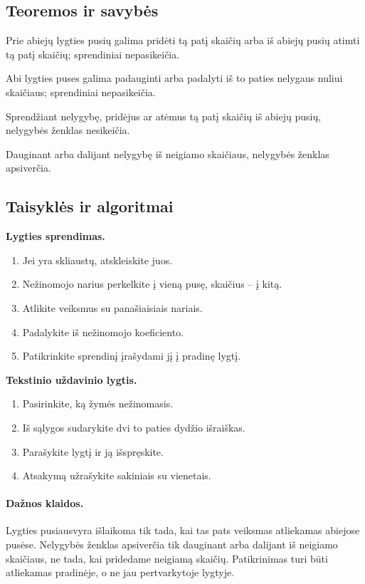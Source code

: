 \subsection{Teoremos ir savybės}
\begin{savybe}
Prie abiejų lygties pusių galima pridėti tą patį skaičių arba iš abiejų pusių atimti tą patį skaičių; sprendiniai nepasikeičia.
\end{savybe}
\begin{savybe}
Abi lygties puses galima padauginti arba padalyti iš to paties nelygaus nuliui skaičiaus; sprendiniai nepasikeičia.
\end{savybe}
\begin{savybe}
Sprendžiant nelygybę, pridėjus ar atėmus tą patį skaičių iš abiejų pusių, nelygybės ženklas nesikeičia.
\end{savybe}
\begin{savybe}
Dauginant arba dalijant nelygybę iš neigiamo skaičiaus, nelygybės ženklas apsiverčia.
\end{savybe}

\subsection{Taisyklės ir algoritmai}
\textbf{Lygties sprendimas.}
\begin{enumerate}[label=\arabic*.]
\item Jei yra skliaustų, atskleiskite juos.
\item Nežinomojo narius perkelkite į vieną pusę, skaičius -- į kitą.
\item Atlikite veiksmus su panašiaisiais nariais.
\item Padalykite iš nežinomojo koeficiento.
\item Patikrinkite sprendinį įrašydami jį į pradinę lygtį.
\end{enumerate}

\textbf{Tekstinio uždavinio lygtis.}
\begin{enumerate}[label=\arabic*.]
\item Pasirinkite, ką žymės nežinomasis.
\item Iš sąlygos sudarykite dvi to paties dydžio išraiškas.
\item Parašykite lygtį ir ją išspręskite.
\item Atsakymą užrašykite sakiniais su vienetais.
\end{enumerate}

\paragraph{Dažnos klaidos.}
Lygties pusiausvyra išlaikoma tik tada, kai tas pats veiksmas atliekamas abiejose pusėse. Nelygybės ženklas apsiverčia tik dauginant arba dalijant iš neigiamo skaičiaus, ne tada, kai pridedame neigiamą skaičių. Patikrinimas turi būti atliekamas pradinėje, o ne jau pertvarkytoje lygtyje.


